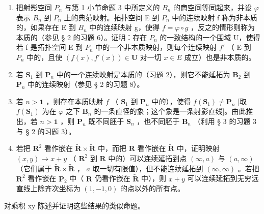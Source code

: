 \begin{enumerate}
\def\labelenumi{\arabic{enumi})}
\setcounter{enumi}{1}
\item
  把射影空间 \(P_{n}\) 与第 1 小节命题 3 中所定义的 \(B_{n}\) 的商空间等同起来，并设 \(\varphi\) 表示 \(B_{n}\) 到 \(P_{n}\) 上的典范映射。拓扑空间 E 到 \(P_{n}\) 中的连续映射 f 称为非本质的，如果存在 E 到 \(B_{n}\) 中的连续映射 g，使得 \(f = \varphi \circ g\) ，反之的情形则称为本质的（参见 § 2 的习题 6）。证明：存在 \(P_{n}\) 的一致结构的一个围域 U，使得若 f 是拓扑空间 E 到 \(P_{n}\) 中的一个非本质映射，则每个连续映射 \(f'\) （ E 到 \(P_{n}\) 中的，且使 \((f(x), f'(x)) \in \mathbf{U}\) 对一切 \(x \in E\) 成立）也是非本质的。
\item
  若 \(\mathbf{S}_1\) 到 \(\mathbf{P}_n\) 中的一个连续映射是本质的（习题 2），则它不能延拓为 \(\mathbf{B}_2\) 到 \(\mathbf{P}_n\) 中的连续映射（参见 § 2 的习题 8）。
\item
  若 \(n > \mathbf{1}\) ，则存在本质映射 \(f\) （ \(\mathbf{S}_1\) 到 \(\mathbf{P}_n\) 中的），使得 \(f(\mathbf{S}_1) \neq \mathbf{P}_n\) {[}取 \(f(\mathbf{S}_1)\) 为在 \(\varphi\) 之下 \(\mathbf{B}_n\) 的一条直径的象；这个象是一条射影直线{]}。由此推出，若 \(n > \mathbf{1}\) ，则 \(\mathbf{P}_n\) 既不同胚于 \(\mathbf{S}_n\) ，也不同胚于 \(\mathbf{B}_n\) （利用 § 3 的习题 3 与 § 2 的习题 3）。
\item
  若把 \(\mathbf{R}^2\) 看作嵌在 \(\tilde{\mathbf{R}} \times \tilde{\mathbf{R}}\) 中，而把 \(\mathbf{R}\) 看作嵌在 \(\tilde{\mathbf{R}}\) 中，证明映射 \((x, y) \to x + y\) （ \(\mathbf{R}^2\) 到 \(\mathbf{R}\) 中的）可以连续延拓到点 \((\infty, a)\) 与 \((a, \infty)\) （它们属于 \(\tilde{\mathbf{R}} \times \tilde{\mathbf{R}}\) ， \(a\) 取一切有限值），但不能连续延拓到 \((\infty, \infty)\) 。若把 \(\mathbf{R}^2\) 看作嵌在 \(\mathbf{P}_2\) 中（ \(\mathbf{R}\) 仍看作嵌在 \(\tilde{\mathbf{R}}\) 中），则 \(x + y\) 可以连续延拓到无穷远直线上除齐次坐标为 \((1, -1, 0)\) 的点以外的所有点。
\end{enumerate}

对乘积 xy 陈述并证明这些结果的类似命题。

